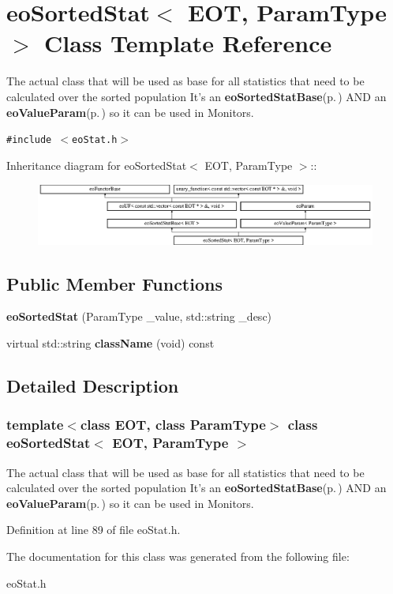 \section{eo\-Sorted\-Stat$<$ EOT, Param\-Type $>$ Class Template Reference}
\label{classeo_sorted_stat}
The actual class that will be used as base for all statistics that need to be calculated over the sorted population It's an {\bf eo\-Sorted\-Stat\-Base}{\rm (p.\,\pageref{classeo_sorted_stat_base})} AND an {\bf eo\-Value\-Param}{\rm (p.\,\pageref{classeo_value_param})} so it can be used in Monitors.  


{\tt \#include $<$eo\-Stat.h$>$}

Inheritance diagram for eo\-Sorted\-Stat$<$ EOT, Param\-Type $>$::\begin{figure}[H]
\begin{center}
\leavevmode
\includegraphics[height=2.04566cm]{classeo_sorted_stat}
\end{center}
\end{figure}
\subsection*{Public Member Functions}
\begin{CompactItemize}
\item 
{\bf eo\-Sorted\-Stat} (Param\-Type \_\-value, std::string \_\-desc)\label{classeo_sorted_stat_a0}

\item 
virtual std::string {\bf class\-Name} (void) const \label{classeo_sorted_stat_a1}

\end{CompactItemize}


\subsection{Detailed Description}
\subsubsection*{template$<$class EOT, class Param\-Type$>$ class eo\-Sorted\-Stat$<$ EOT, Param\-Type $>$}

The actual class that will be used as base for all statistics that need to be calculated over the sorted population It's an {\bf eo\-Sorted\-Stat\-Base}{\rm (p.\,\pageref{classeo_sorted_stat_base})} AND an {\bf eo\-Value\-Param}{\rm (p.\,\pageref{classeo_value_param})} so it can be used in Monitors. 



Definition at line 89 of file eo\-Stat.h.

The documentation for this class was generated from the following file:\begin{CompactItemize}
\item 
eo\-Stat.h\end{CompactItemize}
